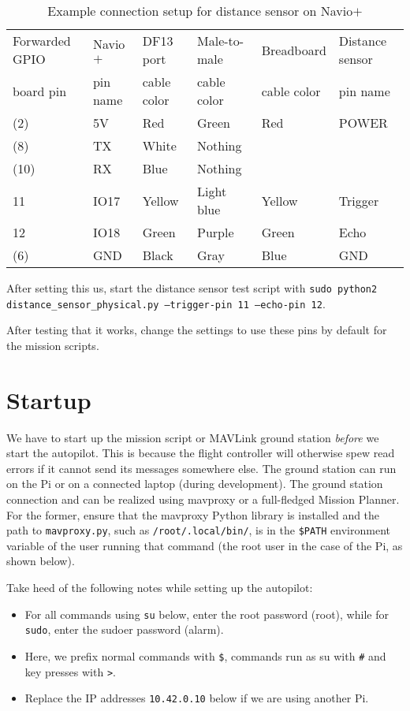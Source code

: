 \documentclass{article}
\newcommand{\navio}{Navio$\stackrel{}{+}$}
\begin{document}
\begin{table}[h!]
  \centering
  \begin{tabular}{llllll}
    \toprule
    Forwarded GPIO & \navio{} & DF13 port   & Male-to-male & Breadboard 
    & Distance sensor \\
    board pin      & pin name & cable color & cable color  & cable color
    & pin name        \\
    \midrule
    (2) & 5V & Red & Green & Red & POWER \\
    (8) & TX & White & Nothing & & \\
    (10) & RX & Blue & Nothing & & \\
    11 & IO17 & Yellow & Light blue & Yellow & Trigger \\
    12 & IO18 & Green & Purple & Green & Echo \\
    (6) & GND & Black & Gray & Blue & GND \\
    \bottomrule
  \end{tabular}
  \caption{Example connection setup for distance sensor on \navio{}}
  \label{tab:navio_distance}
\end{table}

After setting this us, start the distance sensor test script with
{\tt sudo python2 distance\_sensor\_physical.py --trigger-pin 11 --echo-pin 
12}.

After testing that it works, change the settings to use these pins by default 
for the mission scripts.

\section{Startup}
We have to start up the mission script or MAVLink ground station {\it before} 
we start the autopilot. This is because the flight controller will otherwise 
spew read errors if it cannot send its messages somewhere else. The ground 
station can run on the Pi or on a connected laptop (during development). The 
ground station connection  and can be realized using mavproxy or a full-fledged 
Mission Planner. For the former, ensure that the mavproxy Python library is 
installed and the path to {\tt mavproxy.py}, such as {\tt /root/.local/bin/}, 
is in the {\tt \$PATH} environment variable of the user running that command 
(the root user in the case of the Pi, as shown below).

Take heed of the following notes while setting up the autopilot:

\begin{itemize}
  \item For all commands using {\tt su} below, enter the root password (root), 
        while for {\tt sudo}, enter the sudoer password (alarm).
  \item Here, we prefix normal commands with {\tt \$}, commands run as su with 
        {\tt \#} and key presses with {\tt >}.
  \item Replace the IP addresses {\tt 10.42.0.10} below if we are using another 
        Pi.
\end{itemize}
\end{document}
